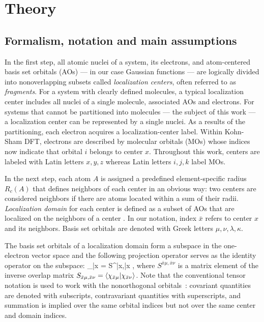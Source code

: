 \documentclass[aps,prl,twocolumn,reprint,amsmath,amssymb]{revtex4-1}
\begin{document}
\section{Theory} 

\subsection{Formalism, notation and main assumptions}
 
In the first step, all atomic nuclei of a system, its electrons, and atom-centered basis set orbitals (AOs) --- in our case Gaussian functions --- are logically divided into nonoverlapping subsets called \emph{localization centers}, often referred to as \emph{fragments}. 
For a system with clearly defined molecules, a typical localization center includes all nuclei of a single molecule, associated AOs and electrons. 
For systems that cannot be partitioned into molecules --- the subject of this work --- a localization center can be represented by a single nuclei. 
As a results of the partitioning, each electron acquires a localization-center label. 
Within Kohn-Sham DFT, electrons are described by molecular orbitals (MOs)  whose indices now indicate that orbital $i$ belongs to center $x$. Throughout this work, centers are labeled with Latin letters $x,y,z$ whereas Latin letters $i,j,k$ label MOs. 

In the next step, each atom $A$ is assigned a predefined element-specific radius $R_c(A)$ that defines neighbors of each center in an obvious way: two centers are considered neighbors if there are atoms located within a sum of their radii. 
\emph{Localization domain} for each center is defined as a subset of AOs that are localized on the neighbors of a center . In our notation, index $\bar{x}$ refers to center $x$ and its neighbors. Basis set orbitals are denoted with Greek letters $\mu,\nu,\lambda, \kappa$. 

The basis set orbitals of a localization domain form a subspace in the one-electron vector space and the following projection operator serves as the identity operator on the subspace:
%
\bea
{}_{\bar{x}} =  S^{\bar{x}\mu,\bar{x}\nu} ,
\eea
%
where $S^{\bar{x}\mu,\bar{x}\nu}$ is a matrix element of the inverse overlap matrix $S_{\bar{x}\mu,\bar{x}\nu} = \langle  \chi_{\bar{x}\mu} \vert  \chi_{\bar{x}\nu} \rangle $. Note that the conventional tensor notation is used to work with the nonorthogonal orbitals~\cite{head1998tensor}: covariant quantities are denoted with subscripts, contravariant quantities with superscripts, and summation is implied over the same orbital indices but not over the same center and domain indices. 
\end{document}
